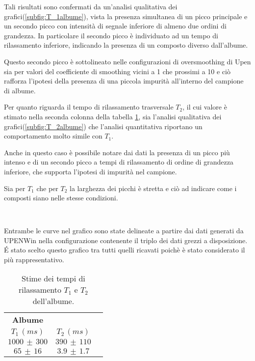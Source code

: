 Tali risultati sono confermati da un'analisi qualitativa dei grafici(\ref{subfig:T_1albume}), vista la presenza simultanea di un picco principale e un secondo picco con intensità di segnale inferiore di almeno due ordini di grandezza. 
In particolare il secondo picco è individuato ad un tempo di rilassamento inferiore, indicando la presenza di un composto diverso dall'albume.

Questo secondo picco è sottolineato nelle configurazioni di oversmoothing di Upen sia per valori del coefficiente di smoothing vicini a 1 che prossimi a 10 e ciò rafforza l'ipotesi della presenza di una piccola impurità all'interno del campione di albume. 

Per quanto riguarda il tempo di rilassamento trasversale $T_2$, il cui valore è stimato nella seconda colonna della tabella \ref{tab:Albume}, sia l'analisi qualitativa dei grafici(\ref{subfig:T_2albume}) che l'analisi quantitativa riportano un comportamento molto simile con $T_1$.

Anche in questo caso è possibile notare dai dati la presenza di un picco più intenso e di un secondo picco a tempi di rilassamento di ordine di grandezza inferiore, che supporta l'ipotesi di impurità nel campione.

Sia per $T_1$ che per $T_2$ la larghezza dei picchi è stretta e ciò ad indicare come i composti siano nelle stesse condizioni. 

\begin{figure}
\centering
{} \quad
{} \\
\caption{}
\label{fig:T_albume}
\end{figure}

Entrambe le curve nel grafico sono state delineate a partire dai dati generati da UPENWin nella configurazione contenente il triplo dei dati grezzi a disposizione.
\'E stato scelto questo grafico tra tutti quelli ricavati poichè è stato considerato il più rappresentativo.

\begin{table}[h!]
	\centering
	\begin{tabular}{ccc}
	\toprule
					\textbf{Albume}	\\
		$T_1\,(ms)$ 		& 		$T_2\,(ms)$ 		\\	
	\midrule
		$1000\,\pm\,300$	&		$390\,\pm\,110$		\\
		$65\,\pm\,16$		&		$3.9\,\pm\,1.7$		\\
	\bottomrule
	\end{tabular}
	\caption{Stime dei tempi di rilassamento $T_1$ e $T_2$ dell'albume.}
	\label{tab:Albume}
\end{table}

